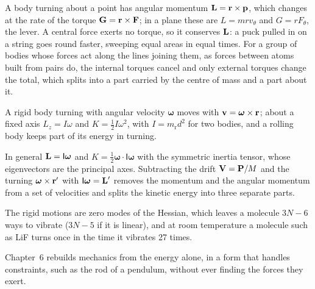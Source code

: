 
A body turning about a point has angular momentum $\bm{\mathrm{L}} = \bm{\mathrm{r}}\times
\bm{\mathrm{p}}$, which changes at the rate of the torque $\bm{\mathrm{G}} = \bm{\mathrm{r}}\times
\bm{\mathrm{F}}$; in a plane these are $L = mrv_\theta$ and $G = rF_\theta$, the
lever. A central force exerts no torque, so it conserves $\bm{\mathrm{L}}$: a puck
pulled in on a string goes round faster, sweeping equal areas in equal
times. For a group of bodies whose forces act along the lines joining
them, as forces between atoms built from pairs do, the internal torques
cancel and only external torques change the total, which splits into a part
carried by the centre of mass and a part about it.

A rigid body turning
with angular velocity $\boldsymbol{\omega}$ moves with $\bm{\mathrm{v}} =
\boldsymbol{\omega}\times\bm{\mathrm{r}}$; about a fixed axis $L_z = I\omega$ and $K
= \frac12 I\omega^2$, with $I = m_{\mathrm r}d^2$ for two bodies, and a
rolling body keeps part of its energy in turning.

In general $\bm{\mathrm{L}} =
\mathsf{I}\boldsymbol{\omega}$ and $K = \frac12\boldsymbol{\omega}\cdot
\mathsf{I}\boldsymbol{\omega}$ with the symmetric inertia tensor, whose
eigenvectors are the principal axes. Subtracting the drift $\bm{\mathrm{V}} =
\bm{\mathrm{P}}/M$ and the turning $\boldsymbol{\omega}\times\bm{\mathrm{r}}'$ with
$\mathsf{I}\boldsymbol{\omega} = \bm{\mathrm{L}}'$ removes the momentum and
the angular momentum from a set of velocities and splits the kinetic energy
into three separate parts.

The rigid motions are zero modes of the
Hessian, which leaves a molecule $3N - 6$ ways to vibrate ($3N - 5$ if it
is linear), and at room temperature a molecule such as LiF turns once in
the time it vibrates 27 times.

Chapter~6 rebuilds mechanics from the energy alone, in a form that
handles constraints, such as the rod of a pendulum, without ever finding
the forces they exert.
